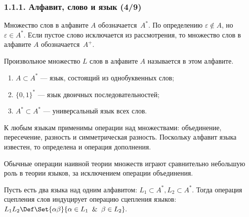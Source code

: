 \begin{frame}
\frametitle{1.1.1. Алфавит, слово и язык (4/9)}
Множество слов в алфавите
${A}$ обозначается~${A^*}$. 
По определению $\varepsilon \not\in A$, но $\varepsilon\in A^*$.
Если пустое слово исключается из рассмотрения, 
то множество слов в алфавите $A$ 
обозначается~$A^+$.

\smallskip
Произвольное множество $L$ слов в алфавите $A$ называется 
 в этом алфавите.

\begin{examples}
\begin{enumerate}
\item $A\subset A^*$ --- язык, состоящий из
однобуквенных слов;
\item $\{0,1\}^*$ --- язык двоичных последовательностей;
\item $A^*\subset A^*$ --- универсальный
язык всех слов.
\end{enumerate}
\end{examples}
 
К любым языкам применимы операции над множествами: объединение, пересечение,
разность и симметрическая разность.
Поскольку алфавит языка известен, то определена и
операция дополнения.

\begin{digress}
Обычные операции наивной теории множеств
играют сравнительно небольшую роль в 
теории языков, за исключением
операции объединения.
\end{digress}

\smallskip
Пусть есть два языка над одним алфавитом:
$L_1 \subset A^*, L_2\subset A^*$.  
Тогда операция сцепления слов индуцирует операцию 
сцепления языков: $L_1 L_2 
\Def \Set{\alpha\beta}{\alpha\in L_1 \And
\beta\in L_2}.$
\end{frame}

